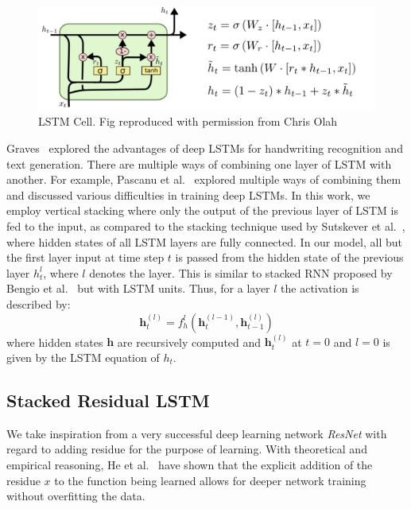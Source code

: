 \begin{figure}
    \centering
    \includegraphics[scale=0.7]{figures/paraphrase/lstm_cell.png}
    \caption{LSTM Cell. Fig reproduced with permission from Chris Olah}
    \label{fig:lstmcell}
\end{figure}
 
 
Graves~\cite{graves2013generating} explored the advantages of deep LSTMs for handwriting recognition and text generation. There are multiple ways of combining one layer of LSTM with another. For example, Pascanu et al.~\cite{pascanu2013construct} explored multiple ways of combining them and discussed various difficulties in training deep LSTMs. In this work, we employ vertical stacking where only the output of the previous layer of LSTM is fed to the input, as compared to
the stacking technique used by Sutskever et al.~\cite{SutskeverVL14}, where hidden states of all LSTM layers are fully connected. In our model, all but the first layer input at time step $t$ is passed from the hidden state of the previous layer $h_{t}^{l}$, where $l$ denotes the layer. This is similar to stacked RNN proposed by Bengio et al.~\cite{Bengio94} but with LSTM units. Thus, for a layer $l$ the activation is described by:
$$
\bm{h}_{t}^{(l)} = f_{h}^{l}(\bm{h}_{t}^{(l-1)}, \bm{h}_{t-1}^{(l)})
$$
where hidden states $\bm{h}$ are recursively computed and $\bm{h}_{t}^{(l)} $ at $t=0$ and $l=0$ is given by the LSTM equation of $h_{t}$.
 
\subsection{Stacked Residual LSTM}
We take inspiration from a very successful deep learning network \emph{ResNet} \cite{he2015deep} with regard to adding residue for the purpose of learning. With  theoretical and empirical reasoning, He et al.~\cite{he2015deep} have shown that the explicit addition of the residue $x$ to the function being learned allows
for deeper network training without overfitting the data.
 
